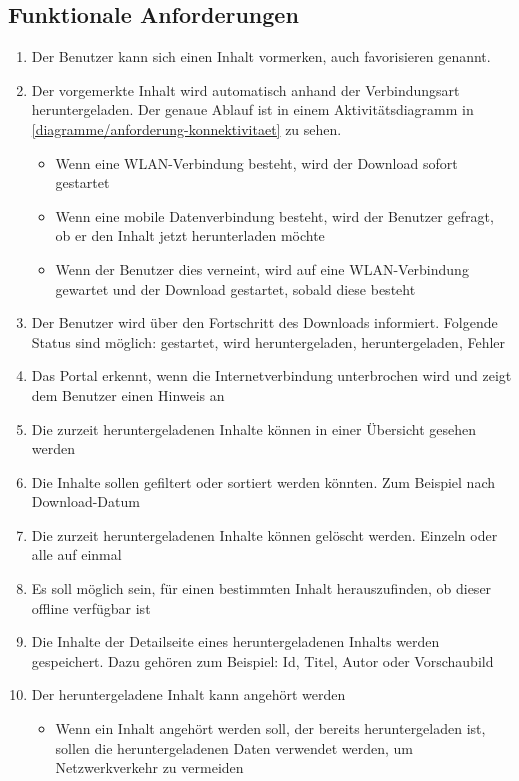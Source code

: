 \subsection{Funktionale Anforderungen}

\begin{enumerate}
	\item Der Benutzer kann sich einen Inhalt vormerken, auch favorisieren genannt.  
	\item Der vorgemerkte Inhalt wird automatisch anhand der Verbindungsart heruntergeladen. Der genaue Ablauf ist in einem Aktivitätsdiagramm in \autoref{diagramme/anforderung-konnektivitaet} zu sehen.
	
	\begin{itemize}
		\item Wenn eine WLAN-Verbindung besteht, wird der Download sofort gestartet
		\item Wenn eine mobile Datenverbindung besteht, wird der Benutzer gefragt, ob er den Inhalt jetzt herunterladen möchte
		\item Wenn der Benutzer dies verneint, wird auf eine WLAN-Verbindung gewartet und der Download gestartet, sobald diese besteht
	\end{itemize}
	

	\item Der Benutzer wird über den Fortschritt des Downloads informiert. Folgende Status sind möglich: gestartet, wird heruntergeladen, heruntergeladen, Fehler
	\item Das Portal erkennt, wenn die Internetverbindung unterbrochen wird und zeigt dem Benutzer einen Hinweis an
	\item Die zurzeit heruntergeladenen Inhalte können in einer Übersicht gesehen werden
	\item Die Inhalte sollen gefiltert oder sortiert werden könnten. Zum Beispiel nach Download-Datum
 	\item Die zurzeit heruntergeladenen Inhalte können gelöscht werden. Einzeln oder alle auf einmal
	\item Es soll möglich sein, für einen bestimmten Inhalt herauszufinden, ob dieser offline verfügbar ist
	\item Die Inhalte der Detailseite eines heruntergeladenen Inhalts werden gespeichert. Dazu gehören zum Beispiel: Id, Titel, Autor oder Vorschaubild
	\item Der heruntergeladene Inhalt kann angehört werden
	\begin{itemize}
		\item Wenn ein Inhalt angehört werden soll, der bereits heruntergeladen ist, sollen die heruntergeladenen Daten verwendet werden, um Netzwerkverkehr zu vermeiden
	\end{itemize}
	
\end{enumerate}

